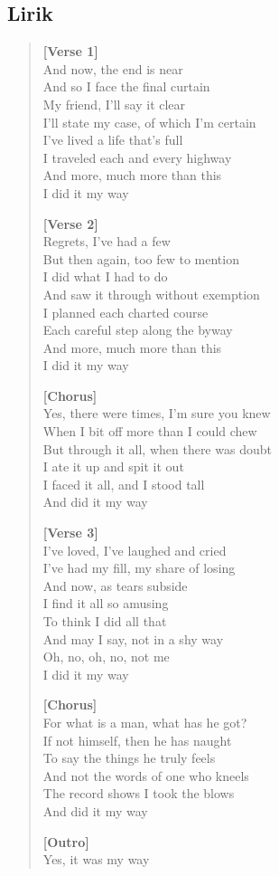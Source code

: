 \documentclass[
  letterpaper,
  DIV=11,
  numbers=noendperiod]{scrreprt}
\begin{document}
\subsection{Lirik}\label{lirik}

\begin{quote}
\textbf{{[}Verse 1{]}}\\
And now, the end is near\\
And so I face the final curtain\\
My friend, I'll say it clear\\
I'll state my case, of which I'm certain\\
I've lived a life that's full\\
I traveled each and every highway\\
And more, much more than this\\
I did it my way

\textbf{{[}Verse 2{]}}\\
Regrets, I've had a few\\
But then again, too few to mention\\
I did what I had to do\\
And saw it through without exemption\\
I planned each charted course\\
Each careful step along the byway\\
And more, much more than this\\
I did it my way

\textbf{{[}Chorus{]}}\\
Yes, there were times, I'm sure you knew\\
When I bit off more than I could chew\\
But through it all, when there was doubt\\
I ate it up and spit it out\\
I faced it all, and I stood tall\\
And did it my way

\textbf{{[}Verse 3{]}}\\
I've loved, I've laughed and cried\\
I've had my fill, my share of losing\\
And now, as tears subside\\
I find it all so amusing\\
To think I did all that\\
And may I say, not in a shy way\\
Oh, no, oh, no, not me\\
I did it my way

\textbf{{[}Chorus{]}}\\
For what is a man, what has he got?\\
If not himself, then he has naught\\
To say the things he truly feels\\
And not the words of one who kneels\\
The record shows I took the blows\\
And did it my way

\textbf{{[}Outro{]}}\\
Yes, it was my way
\end{quote}
\end{document}

